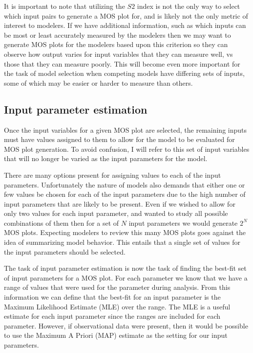 It is important to note that utilizing the $S2$ index is not the only way to select which input pairs to generate a MOS plot for, and is likely not the only metric of interest to modelers. If we have additional information, such as which inputs can be most or least accurately measured by the modelers then we may want to generate MOS plots for the modelers based upon this criterion so they can observe how output varies for input variables that they can measure well, vs those that they can measure poorly. This will become even more important for the task of model selection when competing models have differing sets of inputs, some of which may be easier or harder to measure than others.

\subsection{Input parameter estimation\label{sec:inp_param_est}}
Once the input variables for a given MOS plot are selected, the remaining inputs must have values assigned to them to allow for the model to be evaluated for MOS plot generation. To avoid confusion, I will refer to this set of input variables that will no longer be varied as the input parameters for the model.

There are many options present for assigning values to each of the input parameters. Unfortunately the nature of models also demands that either one or few values be chosen for each of the input parameters due to the high number of input parameters that are likely to be present. Even if we wished to allow for only two values for each input parameter, and wanted to study all possible combinations of them then for a set of $N$ input parameters we would generate $2^N$ MOS plots. Expecting modelers to review this many MOS plots goes against the idea of summarizing model behavior. This entails that a single set of values for the input parameters should be selected.

The task of input parameter estimation is now the task of finding the best-fit set of input parameters for a MOS plot. For each parameter we know that we have a range of values that were used for the parameter during analysis. From this information we can define that the best-fit for an input parameter is the Maximum Likelihood Estimate (MLE) over the range. The MLE is a useful estimate for each input parameter since the ranges are included for each parameter. However, if observational data were present, then it would be possible to use the Maximum A Priori (MAP) estimate as the setting for our input parameters.

